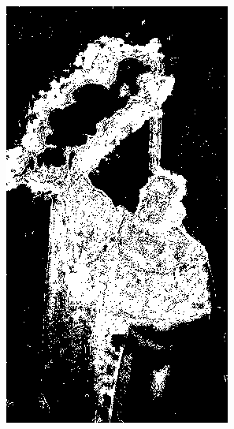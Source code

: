 \begin{figure}[h]
\begin{subfigure}[b]{0.18\textwidth}
         \includegraphics[width=\textwidth]{images/results/base/lighting_fire_bayes.png}
     \end{subfigure}
    \hfill
     \begin{subfigure}[b]{0.18\textwidth}
         \centering

\end{subfigure}
\end{figure}
